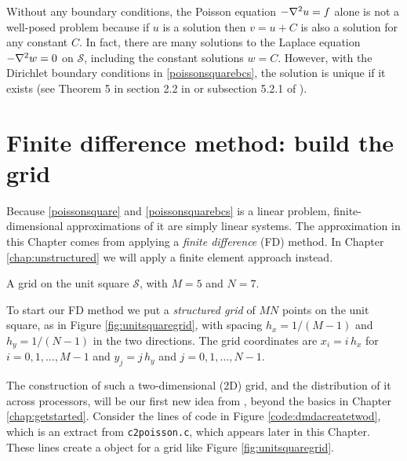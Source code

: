 Without any boundary conditions, the Poisson equation $-\nabla^2 u = f$ alone is not a well-posed problem because if $u$ is a solution then $v=u+C$ is also a solution for any constant $C$.  In fact, there are many solutions to the Laplace equation $-\nabla^2 w = 0$ on $\mathcal{S}$, including the constant solutions $w=C$.  However, with the Dirichlet boundary conditions in \eqref{poissonsquarebcs}, the solution is unique if it exists (see Theorem 5 in section 2.2 in \citep{Evans} or subsection 5.2.1 of \citep{Ockendonetal2003}).


\section{Finite difference method: build the grid}

Because \eqref{poissonsquare} and \eqref{poissonsquarebcs} is a linear problem, finite-dimensional approximations of it are simply linear systems.  The approximation in this Chapter comes from applying a \emph{finite difference} (FD) method.  In Chapter \ref{chap:unstructured} we will apply a finite element approach instead.

\begin{marginfigure}
\caption{A grid on the unit square $\mathcal{S}$, with $M=5$ and $N=7$.}
\label{fig:unitsquaregrid}
\end{marginfigure}

To start our FD method we put a \emph{structured grid} of $MN$ points on the unit square, as in Figure \ref{fig:unitsquaregrid}, with spacing $h_x=1/(M-1)$ and $h_y=1/(N-1)$ in the two directions.  The grid coordinates are $x_i = i\, h_x$ for $i = 0,1,\dots,M-1$ and $y_j = j\, h_y$ and $j=0,1,\dots,N-1$.

The construction of such a two-dimensional (2D) grid, and the distribution of it across processors, will be our first new idea from \PETSc, beyond the basics in Chapter \ref{chap:getstarted}.  Consider the lines of code in Figure \ref{code:dmdacreatetwod}, which is an extract from \texttt{c2poisson.c}, which appears later in this Chapter.  These lines create a \PETSc \pDM object for a grid like Figure \ref{fig:unitsquaregrid}.

